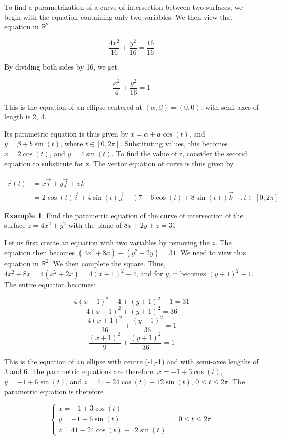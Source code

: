 \documentclass[11pt]{article}
\theoremstyle{plain} %
\theoremstyle{definition}
\theoremstyle{example}
\newtheorem*{example}{Example}
\theoremstyle{remark}
\begin{document}
To find a parametrization of a curve of intersection between two surfaces, we begin with the equation containing only two variables. We then view that equation in $\mathbb R^2$.

$$\frac{4x^2}{16} + \frac{y^2}{16} = \frac{16}{16}$$


By dividing both sides by 16, we get 

$$ \frac{x^2}{4}+\frac{y^2}{16} = 1$$

	
	 This is the equation of an ellipse centered at $(\alpha,\beta) = (0,0)$, with semi-axes of length is 2, 4.

Its parametric equation is thus given by $x = \alpha + a \cos(t)$, and $y = \beta + b \sin(t)$, where $t \in [0, 2\pi]$. Substituting values, this becomes $x =  2 \cos(t)$, and $y =  4 \sin(t)$. To find the value of z, consider the second equation to substitute for z. The vector equation of curve is thus given by 

\begin{align*}
	\vec{r}(t) &= x\vec{i} + y \vec{j} + z \vec{k}\\ 
	&= 2\cos(t)\vec{i} + 4\sin(t) \vec{j} + (7-6\cos(t)+8\sin(t)) \vec{k} \quad,t \in [0, 2\pi]
\end{align*}

\begin{example}
Find the parametric equation of the curve of intersection of the surface $z = 4x^2 +y^2$ with the plane of $8x+2y +z= 31$
\end{example}

Let us first create an equation with two variables by removing the $z$. The equation then becomes $(4x^2+8x)+(y^2+2y)=31$. We need to view this equation in $\mathbb R^2$. We then complete the square. Thus, $4x^2 + 8x = 4(x^2+2x) = 4(x+1)^2 - 4$, and for $y$, it becomes $(y+1)^2-1$. The entire equation becomes:

$$4(x+1)^2 -4 + (y+1)^2-1 = 31$$
$$4(x+1)^2+(y+1)^2 =36$$
$$\frac{4(x+1)^2}{36}+ \frac{(y+1)^2}{36} =1$$
$$\frac{(x+1)^2}{9}+ \frac{(y+1)^2}{36} =1$$


This is the equation of an ellipse with centre (-1,-1) and with semi-axes lengths of 3 and 6.
The parametric equations are therefore: $x = -1 + 3\cos(t)$, $y = -1+6 \sin(t)$, and $z = 41 -24 \cos(t)-12\sin(t)$, $0 \leq t \leq 2 \pi$. The parametric equation is therefore


\[  \begin{cases}
    x = -1 + 3\cos(t)& \quad \\
    y = -1+6 \sin(t)& \quad 0 \leq t \leq 2 \pi\\
    z = 41 -24 \cos(t)-12\sin(t)& \quad
  \end{cases}
\]
\end{document}
